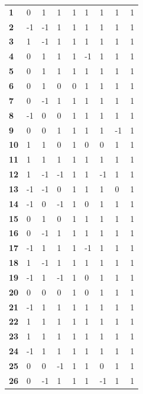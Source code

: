 \documentclass[twoside,openright,notitlepage]{uva-bachelor-thesis}
\begin{document}
 \begin{table}[h!]
\parbox{.45\linewidth}{
\centering
\begin{tabular}{lllllllll}
\textbf{1}  & 0  & 1  & 1  & 1  & 1  & 1  & 1  & 1 \\
\textbf{2 } & -1 & -1 & 1  & 1  & 1  & 1  & 1  & 1 \\
\textbf{3 } & 1  & -1 & 1  & 1  & 1  & 1  & 1  & 1 \\
\textbf{4 } & 0  & 1  & 1  & 1  & -1 & 1  & 1  & 1 \\
\textbf{5 } & 0  & 1  & 1  & 1  & 1  & 1  & 1  & 1 \\
\textbf{6 } & 0  & 1  & 0  & 0  & 1  & 1  & 1  & 1 \\
\textbf{7 } & 0  & -1 & 1  & 1  & 1  & 1  & 1  & 1 \\
\textbf{8 } & -1 & 0  & 0  & 1  & 1  & 1  & 1  & 1 \\
\textbf{9 } & 0  & 0  & 1  & 1  & 1  & 1  & -1 & 1 \\
\textbf{10} & 1  & 1  & 0  & 1  & 0  & 0  & 1  & 1 \\
\textbf{11} & 1  & 1  & 1  & 1  & 1  & 1  & 1  & 1 \\
\textbf{12} & 1  & -1 & -1 & 1  & 1  & -1 & 1  & 1 \\
\textbf{13} & -1 & -1 & 0  & 1  & 1  & 1  & 0  & 1 \\
\textbf{14} & -1 & 0  & -1 & 1  & 0  & 1  & 1  & 1 \\
\textbf{15} & 0  & 1  & 0  & 1  & 1  & 1  & 1  & 1 \\
\textbf{16} & 0  & -1 & 1  & 1  & 1  & 1  & 1  & 1 \\
\textbf{17} & -1 & 1  & 1  & 1  & -1 & 1  & 1  & 1 \\
\textbf{18} & 1  & -1 & 1  & 1  & 1  & 1  & 1  & 1 \\
\textbf{19} & -1 & 1  & -1 & 1  & 0  & 1  & 1  & 1 \\
\textbf{20} & 0  & 0  & 0  & 1  & 0  & 1  & 1  & 1 \\
\textbf{21} & -1 & 1  & 1  & 1  & 1  & 1  & 1  & 1 \\
\textbf{22} & 1  & 1  & 1  & 1  & 1  & 1  & 1  & 1 \\
\textbf{23} & 1  & 1  & 1  & 1  & 1  & 1  & 1  & 1 \\
\textbf{24} & -1 & 1  & 1  & 1  & 1  & 1  & 1  & 1 \\
\textbf{25} & 0  & 0  & -1 & 1  & 1  & 0  & 1  & 1 \\
\textbf{26} & 0  & -1 & 1  & 1  & 1  & -1 & 1  & 1 \\

\end{tabular}}
\end{table}
\end{document}
